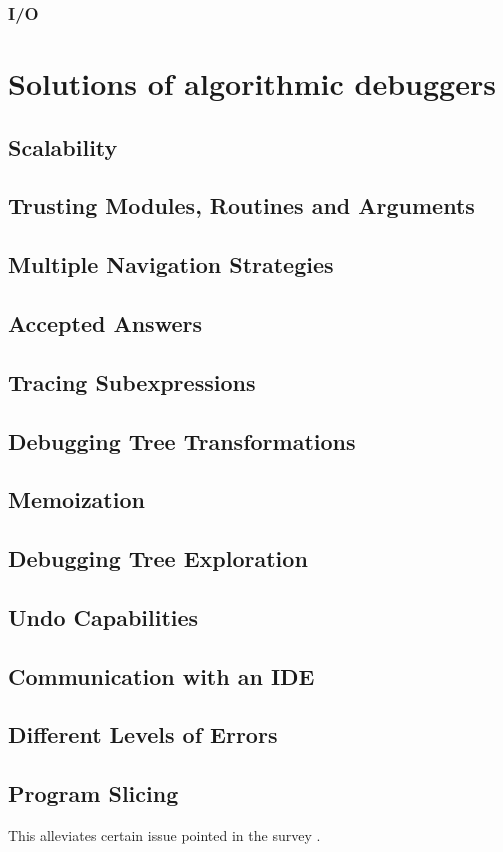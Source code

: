 \subsubsection{I/O}
\section{Solutions of algorithmic debuggers}
\subsection{Scalability}
\subsection{Trusting Modules, Routines and Arguments}
\subsection{Multiple Navigation Strategies}
\subsection{Accepted Answers}
\subsection{Tracing Subexpressions}
\subsection{Debugging Tree Transformations}
\subsection{Memoization}
\subsection{Debugging Tree Exploration}
\subsection{Undo Capabilities}
\subsection{Communication with an IDE}
\subsection{Different Levels of Errors}
\subsection{Program Slicing}
This alleviates certain issue pointed in the survey \cite{unifiedFrameworkDeclarativeDebuggingTesting}.


